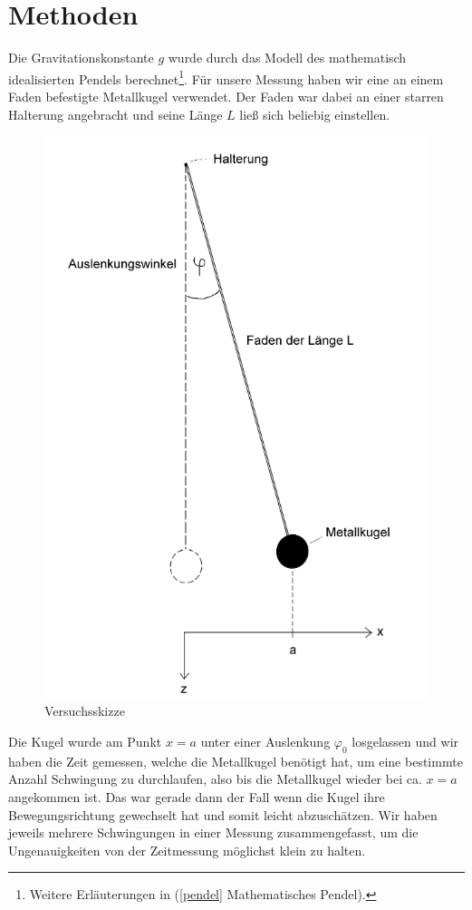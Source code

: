 \documentclass[11pt,a4paper,titlepage, ngerman]{article}
\begin{document}
	\section{Methoden}
		Die Gravitationskonstante $g$ wurde durch das Modell des mathematisch idealisierten Pendels berechnet\footnote{Weitere Erläuterungen in (\ref{pendel} Mathematisches Pendel).}.
		Für unsere Messung haben wir eine an einem Faden befestigte Metallkugel verwendet. Der Faden war dabei an einer starren Halterung angebracht und seine Länge $L$ ließ sich beliebig einstellen.
		\begin{figure}[ht]
			\centering
			\includegraphics[scale=0.4]{Pendel.png}		
			\caption{Versuchsskizze}
			\label{fig:pendel}
		\end{figure}
		
		Die Kugel wurde am Punkt $x = a$ unter einer Auslenkung $\varphi_0$ losgelassen und wir haben die Zeit gemessen, welche die Metallkugel benötigt hat, um eine bestimmte Anzahl Schwingung zu durchlaufen, also bis die Metallkugel wieder bei ca. $x = a$ angekommen ist.
		Das war gerade dann der Fall wenn die Kugel ihre Bewegungsrichtung gewechselt hat und somit leicht abzuschätzen.
		Wir haben jeweils mehrere Schwingungen in einer Messung zusammengefasst, um die Ungenauigkeiten von der Zeitmessung möglichst klein zu halten. 
		
\end{document}
